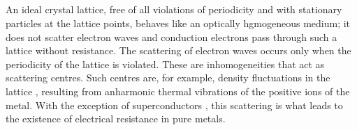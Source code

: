 \subsection{}\label{41.5.4} An ideal crystal lattice, free of all violations of periodicity and with stationary particles at the lattice points, behaves like an optically hgmogeneous medium; it does not scatter electron waves and conduction electrons pass through such a lattice without resistance. The scattering of electron waves occurs only when the periodicity of the lattice is violated. These are inhomogeneities that act as scattering centres. Such centres are, for example, density fluctuations in the lattice , resulting from anharmonic thermal vibrations of the positive ions of the metal. With the exception of superconductors  , this scattering is what leads to the existence of electrical resistance in pure metals.

